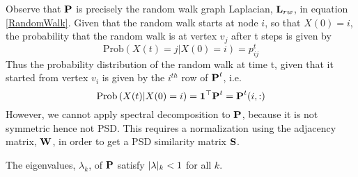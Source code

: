 Observe that $\textbf{P}$ is precisely the random walk graph Laplacian, $\textbf{L}_{rw}$, in equation \eqref{RandomWalk}.
Given that the random walk starts at node $i$, so that $X(0) = i$, the probability
that the random walk is at vertex $v_{j}$ after t steps is given by
\[
\text{Prob}\left( X(t) = j | X(0) = i  \right) = p_{ij}^{t}
\]
Thus the probability distribution of the random walk at time t, given that it started from vertex $v_{i}$ is given by the  $i^{th}$ row of $\textbf{P}^{t}$, i.e.
\begin{equation}\label{pdftime}
\text{Prob}\left( X(t) | X(0) = i  \right) = \boldsymbol{1}^{\top}\textbf{P}^{t} = \textbf{P}^{t}(i, :)
\end{equation}
However, we cannot apply spectral decomposition to $\textbf{P}$, because it is
not symmetric hence not PSD.
This requires a normalization using the adjacency matrix, $\textbf{W}$, in order
to get a PSD similarity matrix $\textbf{S}$.

The eigenvalues, $\lambda_{k}$, of $\textbf{P}$ satisfy $\lvert\lambda\rvert_{k} < 1$
for all $k$.

